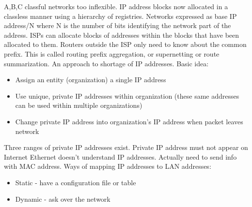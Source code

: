 \documentclass[number]{notes}
\begin{document}
\begin{landscape}
\begin{multicols}{3}
A,B,C classful networks too inflexible. IP address blocks now allocated in a classless manner using a hierarchy of registries. Networks expressed as base IP address/N where N is the number of bits identifying the network part of the address.
ISPs can allocate blocks of addresses within the blocks that have been allocated to them. Routers outside the ISP only need to know about the common prefix. This is called routing prefix aggregation, or supernetting or route summarization.
An approach to shortage of IP addresses.
Basic idea:
\begin{itemize}[nolistsep]
    \item Assign an entity (organization) a single IP address
    \item Use unique, private IP addresses within organization (these same addresses can be used within multiple organizations)
    \item Change private IP address into organization's IP address when packet leaves network
\end{itemize}
Three ranges of private IP addresses exist. Private IP address must not appear on Internet
Ethernet doesn't understand IP addresses. Actually need to send info with MAC address. Ways of mapping IP addresses to LAN addresses:
\begin{itemize}[nolistsep]
    \item Static - have a configuration file or table
    \item Dynamic - ask over the network
\end{itemize}

\end{multicols}
\end{landscape}
\end{document}
